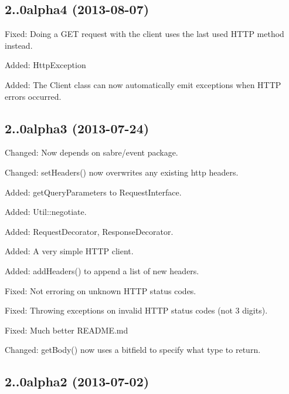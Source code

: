 \subsection*{2..\+0alpha4 (2013-\/08-\/07) }


\begin{DoxyItemize}
\item Fixed\+: Doing a G\+ET request with the client uses the last used H\+T\+TP method instead.
\item Added\+: Http\+Exception
\item Added\+: The Client class can now automatically emit exceptions when H\+T\+TP errors occurred.
\end{DoxyItemize}

\subsection*{2..\+0alpha3 (2013-\/07-\/24) }


\begin{DoxyItemize}
\item Changed\+: Now depends on sabre/event package.
\item Changed\+: set\+Headers() now overwrites any existing http headers.
\item Added\+: get\+Query\+Parameters to Request\+Interface.
\item Added\+: Util\+::negotiate.
\item Added\+: Request\+Decorator, Response\+Decorator.
\item Added\+: A very simple H\+T\+TP client.
\item Added\+: add\+Headers() to append a list of new headers.
\item Fixed\+: Not erroring on unknown H\+T\+TP status codes.
\item Fixed\+: Throwing exceptions on invalid H\+T\+TP status codes (not 3 digits).
\item Fixed\+: Much better R\+E\+A\+D\+M\+E.\+md
\item Changed\+: get\+Body() now uses a bitfield to specify what type to return.
\end{DoxyItemize}

\subsection*{2..\+0alpha2 (2013-\/07-\/02) }


